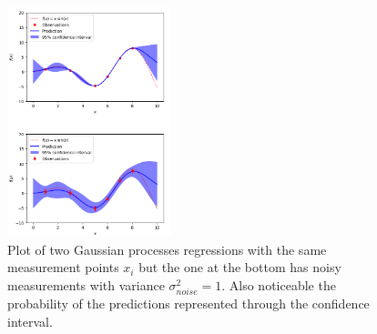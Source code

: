 \begin{figure}[h!]
	\centering
	\includegraphics[width=0.425\textwidth]{images/gaussian_process_example.png}
	\caption{
			Plot of two Gaussian processes regressions with the same measurement points $x_i$
			but the one at the bottom has noisy measurements with variance $\sigma_{noise}^2 = 1$.
			Also noticeable the probability of the predictions represented through the confidence interval.
        }
	\label{fig:gaussian_process_example}
\end{figure}

